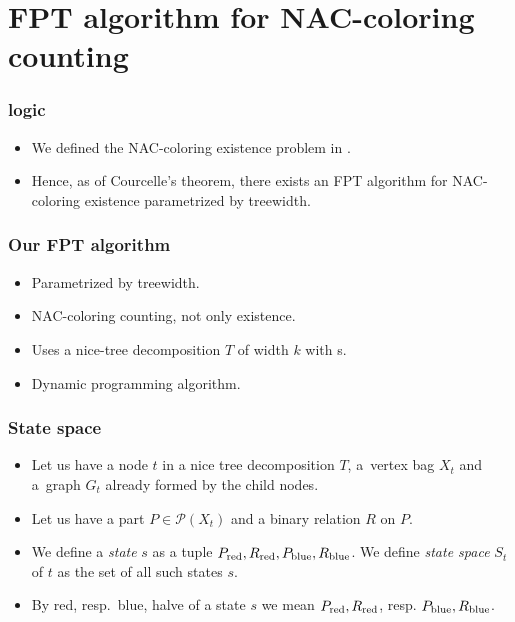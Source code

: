 \documentclass[aspectratio=\myaspectratio]{beamer}
\begin{document}
\section{FPT algorithm for NAC-coloring counting}

\begin{frame}
	\frametitle{\MSO{} logic}
	\begin{itemize}
		\item
		      We defined the NAC-coloring existence problem in \MSO{}.
		\item
		      Hence, as of Courcelle's theorem, there exists an FPT algorithm
		      for NAC-coloring existence parametrized by treewidth.
	\end{itemize}
\end{frame}

\begin{frame}
	\frametitle{Our FPT algorithm}

	\begin{itemize}
		\item
		      Parametrized by treewidth.
		\item
		      NAC-coloring counting, not only existence.
		\item
		      Uses a nice-tree decomposition \( T \) of width \( k \)
		      with \IntroduceEdgeNode{}s.
		\item
		      Dynamic programming algorithm.
	\end{itemize}
\end{frame}

\begin{frame}
	\frametitle{State space}

	\begin{itemize}
		\item
		      Let us have a node \( t \) in a nice tree decomposition \( T \),
		      a~vertex bag \( X_t \) and
		      a~graph \( G_t \) already formed by the child nodes.
		\item
		      Let us have a part \( P \in \mathcal{P}(X_t) \)
		      and a binary relation \( R \) on \( P \).
		\item
		      We define a \emph{state} \( s \) as a tuple \( P_{\text{red}}, R_{\text{red}}, P_{\text{blue}}, R_{\text{blue}} \).
		      We define \emph{state space} \( S_t \) of \( t \) as the set of all such states \( s \).
		\item
		      By red, resp.\ blue, halve of a state \( s \)
		      we mean \( P_{\text{red}}, R_{\text{red}} \), resp. \( P_{\text{blue}}, R_{\text{blue}} \).
	\end{itemize}
\end{frame}
\end{document}
